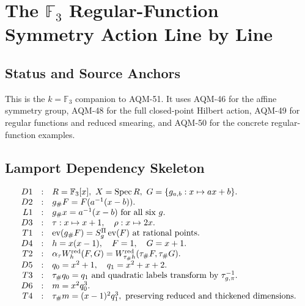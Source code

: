 
\section{The \texorpdfstring{\(\mathbb F_3\)}{F3} Regular-Function Symmetry Action Line by Line}
\label{sec:f3-regular-function-symmetry-line-by-line}

\subsection{Status and Source Anchors}
This is the \(k=\mathbb F_3\) companion to AQM-51.  It uses AQM-46 for the
affine symmetry group, AQM-48 for the full closed-point Hilbert action,
AQM-49 for regular functions and reduced smearing, and AQM-50 for the concrete
regular-function examples.

\subsection{Lamport Dependency Skeleton}
\[
\begin{array}{rcl}
D1&:&R=\mathbb F_3[x],\ X=\operatorname{Spec} R,\ G=\{g_{a,b}:x\mapsto ax+b\}.\\
D2&:&g_\#F=F(a^{-1}(x-b)).\\
L1&:&g_\#x=a^{-1}(x-b)\text{ for all six }g.\\
D3&:&\tau:x\mapsto x+1,\quad \rho:x\mapsto2x.\\
T1&:&\operatorname{ev}(g_\#F)=S_g^\Pi\operatorname{ev}(F)\text{ at rational points.}\\
D4&:&h=x(x-1),\quad F=1,\quad G=x+1.\\
T2&:&\alpha_\tau W_h^{\rm red}(F,G)=W_{\tau_\#h}^{\rm red}(\tau_\#F,\tau_\#G).\\
D5&:&q_0=x^2+1,\quad q_1=x^2+x+2.\\
T3&:&\tau_\#q_0=q_1\text{ and quadratic labels transform by }\tau_{g,\pi}^{-1}.\\
D6&:&m=x^2q_0^3.\\
T4&:&\tau_\#m=(x-1)^2q_1^3,\text{ preserving reduced and thickened dimensions.}
\end{array}
\]

